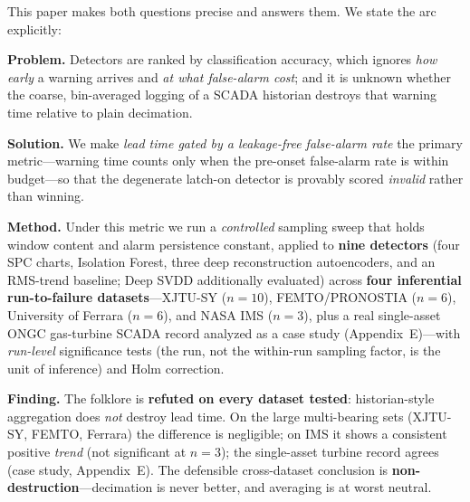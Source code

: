 \documentclass[journal]{IEEEtran}
\begin{document}
This paper makes both questions precise and answers them. We state the arc
explicitly:

\textbf{Problem.} Detectors are ranked by classification accuracy, which ignores
\emph{how early} a warning arrives and \emph{at what false-alarm cost}; and it is
unknown whether the coarse, bin-averaged logging of a SCADA historian destroys
that warning time relative to plain decimation.

\textbf{Solution.} We make \emph{lead time gated by a leakage-free false-alarm
rate} the primary metric---warning time counts only when the pre-onset
false-alarm rate is within budget---so that the degenerate latch-on detector is
provably scored \emph{invalid} rather than winning.

\textbf{Method.} Under this metric we run a \emph{controlled} sampling sweep that
holds window content and alarm persistence constant, applied to \textbf{nine detectors} (four SPC charts, Isolation Forest, three
deep reconstruction autoencoders, and an RMS-trend baseline; Deep SVDD
additionally evaluated) across \textbf{four inferential run-to-failure
datasets}---XJTU-SY ($n{=}10$), FEMTO/PRONOSTIA ($n{=}6$), University of Ferrara
($n{=}6$), and NASA IMS ($n{=}3$), plus a real single-asset ONGC gas-turbine
SCADA record analyzed as a case study (Appendix~E)---with
\emph{run-level} significance tests (the run, not the within-run sampling factor,
is the unit of inference) and Holm correction.

\textbf{Finding.} The folklore is \textbf{refuted on every dataset tested}: historian-style
aggregation does \emph{not} destroy lead time. On the large multi-bearing sets
(XJTU-SY, FEMTO, Ferrara) the difference is negligible; on IMS it shows a
consistent positive \emph{trend} (not significant at $n{=}3$); the single-asset
turbine record agrees (case study, Appendix~E). The defensible cross-dataset
conclusion is \textbf{non-destruction}---decimation is never better, and averaging
is at worst neutral.
\end{document}
